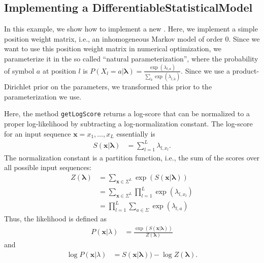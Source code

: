\subsection{Implementing a DifferentiableStatisticalModel}
In this example, we show how to implement a new \DiffSM. Here, we implement a simple position weight matrix, i.e., an inhomogeneous Markov model of order $0$. Since we want to use this position weight matrix in numerical optimization, we parameterize it in the so called ``natural parameterization'', where the probability of symbol $a$ at position $l$ is $P(X_l=a | \boldsymbol{\lambda}) = \frac{\exp(\lambda_{l,a})}{ \sum_{\tilde{a}} \exp(\lambda_{l,\tilde{a}}) }$. Since we use a product-Dirichlet prior on the parameters, we transformed this prior to the parameterization we use.

Here, the method \lstinline+getLogScore+ returns a log-score that can be normalized to a proper log-likelihood by subtracting a log-normalization constant.
The log-score for an input sequence $\mathbf{x} = x_1,\ldots,x_L$ essentially is
\begin{align*}
S(\mathbf{x}|\boldsymbol{\lambda}) &= \sum_{l=1}^{L} \lambda_{l,x_l}.
\end{align*}
The normalization constant is a partition function, i.e., the sum of the scores over all possible input sequences:
\begin{align*}
Z(\boldsymbol{\lambda}) &= \sum_{\mathbf{x} \in \Sigma^L} \exp( S(\mathbf{x}|\boldsymbol{\lambda}) )\\
&= \sum_{\mathbf{x} \in \Sigma^L} \prod_{l=1}^{L} \exp(\lambda_{l,x_l})\\
&= \prod_{l=1}^{L} \sum_{a \in \Sigma} \exp(\lambda_{l,a})
\end{align*}
Thus, the likelihood is defined as
\begin{align*}
P(\mathbf{x}|\lambda) &= \frac{\exp(S(\mathbf{x}|\boldsymbol{\lambda}))}{Z(\boldsymbol{\lambda})}
\end{align*}
and
\begin{align*}
\log P(\mathbf{x}|\lambda) &= S(\mathbf{x}|\boldsymbol{\lambda})) - \log Z(\boldsymbol{\lambda}).
\end{align*}
\renewcommand{\codefile}{recipes/PositionWeightMatrixDiffSM.java}
\setcounter{off}{34}
